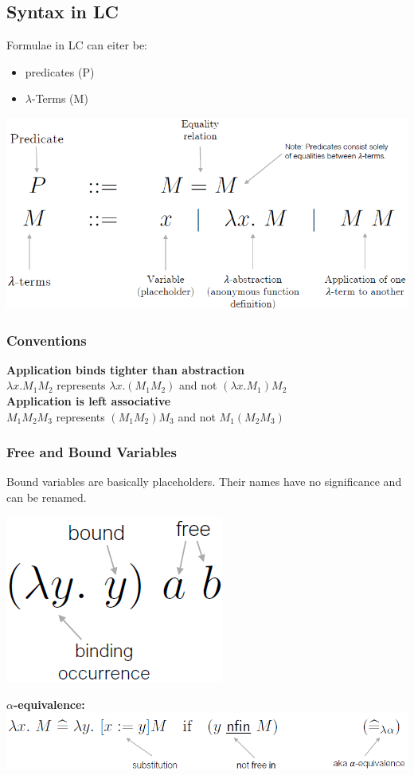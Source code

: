 \subsection{Syntax in LC}
Formulae in LC can eiter be:
\begin{itemize}
    \item predicates (P)
    \item $\lambda$-Terms (M)
\end{itemize}
\includegraphics[width=\linewidth]{img/lc_syntax.png}

\subsubsection{Conventions}
\textbf{Application binds tighter than abstraction}\\
$\lambda x.M_1 M_2$ represents $\lambda x.(M_1M_2)$ and not $(\lambda x.M_1) M_2$\\ 
\textbf{Application is left associative}\\ 
$M_1 M_2 M_3$ represents $(M_1 M_2) M_3$ and not $M_1 (M_2 M_3)$

\subsubsection{Free and Bound Variables}
Bound variables are basically placeholders. 
Their names have no significance and can be renamed.\\
\begin{center}
\includegraphics[width=0.2\linewidth]{img/lc_variables.png}
\end{center}
\textbf{$\alpha$-equivalence:}\\
\includegraphics[width=\linewidth]{img/lc_alpha.png}

